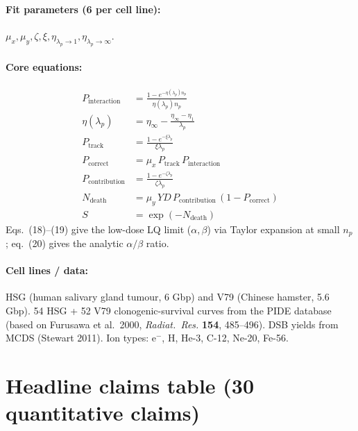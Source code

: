 \documentclass[11pt]{article}
\begin{document}
\paragraph{Fit parameters (6 per cell line):} $\mu_x, \mu_y, \zeta, \xi, \eta_{\lambda_p\to 1}, \eta_{\lambda_p\to\infty}$.

\paragraph{Core equations:}
\begin{align*}
P_{\text{interaction}} &= \frac{1 - e^{-\eta(\lambda_p) n_p}}{\eta(\lambda_p) n_p} \tag{7}\\
\eta(\lambda_p) &= \eta_\infty - \frac{\eta_\infty - \eta_1}{\lambda_p} \tag{8}\\
P_{\text{track}} &= \frac{1 - e^{-\xi \lambda_p}}{\xi \lambda_p} \tag{9}\\
P_{\text{correct}} &= \mu_x \, P_{\text{track}} \, P_{\text{interaction}} \tag{10}\\
P_{\text{contribution}} &= \frac{1 - e^{-\zeta \lambda_p}}{\zeta \lambda_p} \tag{11}\\
N_{\text{death}} &= \mu_y \, Y D \, P_{\text{contribution}} \, (1 - P_{\text{correct}}) \tag{13}\\
S &= \exp(-N_{\text{death}}) \tag{15}
\end{align*}
Eqs.\ (18)--(19) give the low-dose LQ limit ($\alpha,\beta$) via Taylor expansion at small $n_p$; eq.\ (20) gives the analytic $\alpha/\beta$ ratio.

\paragraph{Cell lines / data:} HSG (human salivary gland tumour, 6 Gbp) and V79 (Chinese hamster, 5.6 Gbp). 54 HSG + 52 V79 clonogenic-survival curves from the PIDE database (based on Furusawa et al.\ 2000, \textit{Radiat.\ Res.} \textbf{154}, 485--496). DSB yields from MCDS (Stewart 2011). Ion types: e$^-$, H, He-3, C-12, Ne-20, Fe-56.

\section{Headline claims table (30 quantitative claims)}
\end{document}

